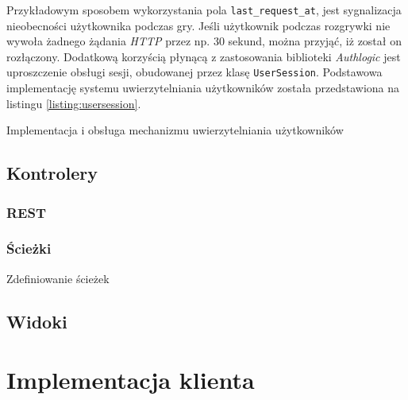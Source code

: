 \documentclass[a4paper,12pt]{article}
\begin{document}
Przykładowym sposobem wykorzystania pola \texttt{last\_request\_at},
jest sygnalizacja nieobecności użytkownika podczas gry. Jeśli
użytkownik podczas rozgrywki nie wywoła żadnego żądania \emph{HTTP}
przez np. 30 sekund, można przyjąć, iż został on rozłączony. Dodatkową
korzyścią płynącą z zastosowania biblioteki \emph{Authlogic} jest
uproszczenie obsługi sesji, obudowanej przez klasę
\texttt{UserSession}. Podstawowa implementację systemu
uwierzytelniania użytkowników została przedstawiona na listingu
\ref{listing:usersession}.

\begin{listing}
  
  \caption{Implementacja i obsługa mechanizmu uwierzytelniania
    użytkowników}
  \label{listing:usersession}
\end{listing}

\subsection{Kontrolery}

\subsubsection{REST}



\subsubsection{Ścieżki}

\begin{listing}
  
  \caption{Zdefiniowanie ścieżek}
  \label{listing:routes}
\end{listing}




\subsection{Widoki}

\clearpage

\section{Implementacja klienta}


\clearpage



\end{document}
